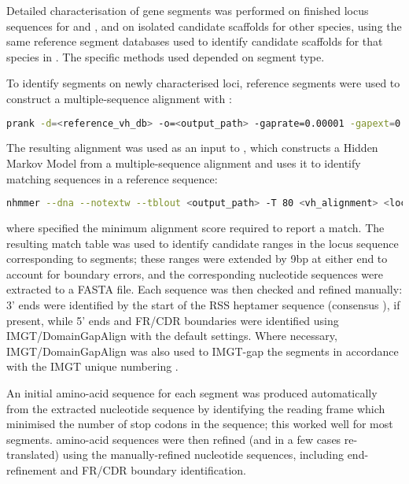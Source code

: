 Detailed characterisation of \igh{} gene segments was performed on finished \igh{} locus sequences for \xma and \nfu, and on isolated candidate scaffolds for other species, using the same reference segment databases used to identify candidate scaffolds for that species in . The specific methods used depended on segment type.

\subsubsubsection{\vh}

\noindent To identify \vh segments on newly characterised loci, reference \vh segments were used to construct a multiple-sequence alignment with  \parencite{loytynoja2014prank}:

\begin{lstlisting}[language=bash]
prank -d=<reference_vh_db> -o=<output_path> -gaprate=0.00001 -gapext=0.00001 -F -termgap
\end{lstlisting}

\noindent The resulting alignment was used as an input to  \parencite{wheeler2013nhmmer,eddy2011hmm,eddy2009homology,eddy2008alignment}, which constructs a Hidden Markov Model from a multiple-sequence alignment and uses it to identify matching sequences in a reference sequence:

\begin{lstlisting}[language=bash]
nhmmer --dna --notextw --tblout <output_path> -T 80 <vh_alignment> <locus_sequence_path>
\end{lstlisting}

\noindent where  specified the minimum alignment score required to report a match. The resulting match table was used to identify candidate ranges in the locus sequence corresponding to \vh segments; these ranges were extended by 9bp at either end to account for boundary errors, and the corresponding nucleotide sequences were extracted to a FASTA file. Each sequence was then checked and refined manually: 3' ends were identified by the start of the RSS heptamer sequence (consensus  \parencite{hesse1989rss}), if present, while 5' ends and FR/CDR boundaries were identified using IMGT/DomainGapAlign \parencite{ehrenmann2011domaingapalign} with the default settings. Where necessary, IMGT/DomainGapAlign was also used to IMGT-gap the \vh segments in accordance with the IMGT unique numbering \parencite{lefranc2003vnumbering}.

An initial amino-acid sequence for each \vh segment was produced automatically from the extracted nucleotide sequence by identifying the reading frame which minimised the number of stop codons in the sequence; this worked well for most segments. \vh amino-acid sequences were then refined (and in a few cases re-translated) using the manually-refined nucleotide sequences, including end-refinement and FR/CDR boundary identification.

